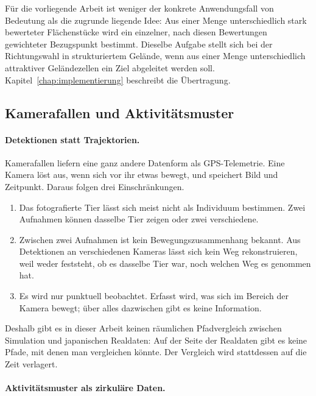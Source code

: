 \documentclass[12pt,a4paper]{report}
\begin{document}
Für die vorliegende Arbeit ist weniger der konkrete Anwendungsfall von Bedeutung als die
zugrunde liegende Idee: Aus einer Menge unterschiedlich stark bewerteter Flächenstücke wird
ein einzelner, nach diesen Bewertungen gewichteter Bezugspunkt bestimmt. Dieselbe Aufgabe
stellt sich bei der Richtungswahl in strukturiertem Gelände, wenn aus einer Menge
unterschiedlich attraktiver Geländezellen ein Ziel abgeleitet werden soll.
Kapitel~\ref{chap:implementierung} beschreibt die Übertragung.

\subsection{Kamerafallen und Aktivitätsmuster}
\label{subsec:kamerafallen}

\paragraph{Detektionen statt Trajektorien.}

Kamerafallen liefern eine ganz andere Datenform als GPS-Telemetrie. Eine Kamera löst aus,
wenn sich vor ihr etwas bewegt, und speichert Bild und Zeitpunkt. Daraus folgen drei
Einschränkungen.


\begin{enumerate}
    \item Das fotografierte Tier lässt sich meist nicht
    als Individuum bestimmen. Zwei Aufnahmen können
    dasselbe Tier zeigen oder zwei verschiedene.

    \item Zwischen zwei Aufnahmen ist kein
    Bewegungszusammenhang bekannt. Aus Detektionen an
    verschiedenen Kameras lässt sich kein Weg
    rekonstruieren, weil weder feststeht, ob es
    dasselbe Tier war, noch welchen Weg es genommen hat.

    \item Es wird nur punktuell beobachtet. Erfasst
    wird, was sich im Bereich der Kamera bewegt;
    über alles dazwischen gibt es keine Information.
\end{enumerate}


Deshalb gibt es in dieser Arbeit keinen räumlichen Pfadvergleich zwischen Simulation und
japanischen Realdaten: Auf der Seite der Realdaten gibt es keine Pfade, mit denen man
vergleichen könnte. Der Vergleich wird stattdessen auf die Zeit verlagert.

\paragraph{Aktivitätsmuster als zirkuläre Daten.}
\end{document}
